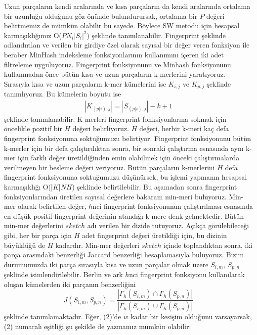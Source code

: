 Uzun parçaların kendi aralarında ve kısa parçaların da kendi aralarında ortalama bir uzunluğu olduğunu göz önünde bulundurursak, ortalama bir $P$ değeri belirtmemiz de mümkün olabilir bu sayede. Böylece SW metodu için hesapsal karmaşıklığımız O($P$$N_i$|$S_i|^2$) şeklinde tanımlanabilir. Fingerprint şeklinde adlandırılan ve verilen bir girdiye özel olarak sayısal bir değer veren fonksiyon ile beraber MinHash indeksleme fonksiyonlarının kullanımını içeren iki adet filtreleme uyguluyoruz. Fingerprint fonksiyonunu ve Minhash fonksiyonunu kullanmadan önce bütün kısa ve uzun parçaların k-merlerini yaratıyoruz. Sırasıyla kısa ve uzun parçaların k-mer kümelerini ise $K_{i,j}$ ve $K_{p,j}$ şeklinde tanımlıyoruz. Bu kümelerin boyutu ise
\begin{gather*}
| K_{(p | i), j} | = |S_{(p | i),j}| - k + 1
\end{gather*}
şeklinde tanımlanabilir. K-merleri fingerprint fonksiyonlarına sokmak için öncelikle pozitif bir $H$ değeri belirliyoruz. $H$ değeri, herbir k-meri kaç defa fingerprint fonksiyonuna soktuğumuzu belirtiyor. Fingerprint fonksiyonunu bütün k-merler için bir defa çalıştırdıktan sonra, bir sonraki çalıştırma esnasında aynı k-mer için farklı değer üretildiğinden emin olabilmek için önceki çalıştırmalarda verilmeyen bir besleme değeri veriyoruz. Bütün parçaların k-merlerini $H$ defa fingerprint fonksiyonuna soktuğumuzu düşünürsek, bu işlemi yapmanın hesapsal karmaşıklığı O(|$K$|$NH$) şeklinde belirtilebilir. Bu aşamadan sonra fingerprint fonksiyonlarından üretilen sayısal değerlere bakaram min-meri buluyoruz. Min-mer olarak belirtilen değer, $h$nci fingerprint fonksiyonunun çalıştırılması esnasında en düşük positif fingerprint değerinin atandığı k-mere denk gelmektedir. Bütün min-mer değerlerini $sketch$ adı verilen bir dizide tutuyoruz. Açıkça görülebileceği gibi, her bir parça için $H$ adet fingerprint değeri üretildiği için, bu dizinin büyüklüğü de $H$ kadardır. Min-mer değerleri $sketch$ içinde toplandıktan sonra, iki parça arasındaki benzerliği Jaccard benzerliği \cite{Jaccard1901} hesaplamasıyla buluyoruz. Bizim durumumuzda iki parça sırasıyla kısa ve uzun parçalar olmak üzere $S_{i,m}$, $S_{p,n}$ şeklinde isimlendirilebilir. Berlin ve ark $h$nci fingerprint fonksiyonu kullanılarak oluşan kümelerden iki parçanın benzerliğini
\begin{equation}
J(S_{i,m}, S_{p,n}) = \dfrac{|\Gamma_{h}(S_{i,m}) \cap \Gamma_{h}(S_{p,n})|}{|\Gamma_{h}(S_{i,m}) \cup \Gamma_{h}(S_{p,n})|}
\end{equation}
şeklinde tanımlamaktadır. Eğer, (2)'de $w$ kadar bir kesişim olduğunu varsayarsak, (2) numaralı eşitliği şu şekilde de yazmamız mümkün olabilir:
$$
